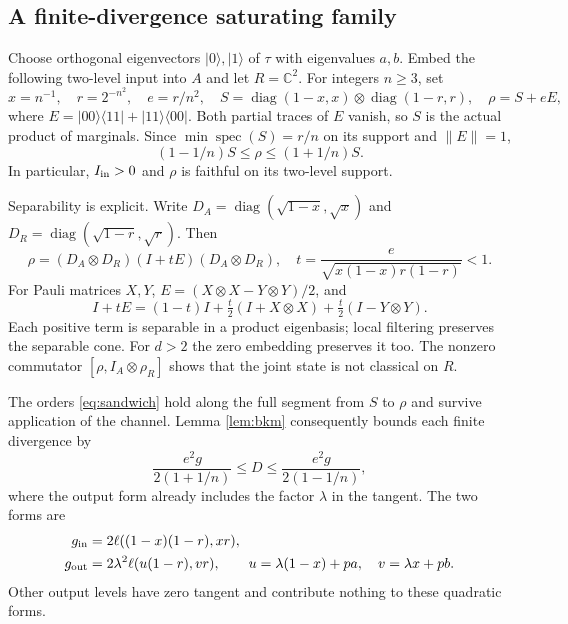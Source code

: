 \documentclass[11pt]{article}
\newcommand{\ket}[1]{|#1\rangle}
\newcommand{\bra}[1]{\langle#1|}
\begin{document}
\subsection{A finite-divergence saturating family}
Choose orthogonal eigenvectors $\ket0,\ket1$ of $\tau$ with eigenvalues $a,b$. Embed the following two-level input into $A$ and let $R=\mathbb C^2$. For integers $n\ge3$, set
\begin{equation}\label{eq:sequence}
 x=n^{-1},\quad r=2^{-n^2},\quad e=r/n^2,\quad
 S=\operatorname{diag}(1-x,x)\otimes\operatorname{diag}(1-r,r),
 \quad\rho=S+eE,
\end{equation}
where $E=\ket{00}\bra{11}+\ket{11}\bra{00}$. Both partial traces of $E$ vanish, so $S$ is the actual product of marginals. Since $\min\operatorname{spec}(S)=r/n$ on its support and $\|E\|=1$,
\begin{equation}\label{eq:sandwich}
 (1-1/n)S\le\rho\le(1+1/n)S.
\end{equation}
In particular, $I_{\rm in}>0$ and $\rho$ is faithful on its two-level support.

Separability is explicit. Write $D_A=\operatorname{diag}(\sqrt{1-x},\sqrt{x})$ and $D_R=\operatorname{diag}(\sqrt{1-r},\sqrt r)$. Then
\[
 \rho=(D_A\otimes D_R)(I+tE)(D_A\otimes D_R),\quad
 t=\frac{e}{\sqrt{x(1-x)r(1-r)}}<1.
\]
For Pauli matrices $X,Y$, $E=(X\otimes X-Y\otimes Y)/2$, and
\[
 I+tE=(1-t)I+\tfrac t2(I+X\otimes X)+\tfrac t2(I-Y\otimes Y).
\]
Each positive term is separable in a product eigenbasis; local filtering preserves the separable cone. For $d>2$ the zero embedding preserves it too. The nonzero commutator $[\rho,I_A\otimes\rho_R]$ shows that the joint state is not classical on $R$.

The orders \eqref{eq:sandwich} hold along the full segment from $S$ to $\rho$ and survive application of the channel. Lemma \ref{lem:bkm} consequently bounds each finite divergence by
\begin{equation}\label{eq:finite}
 \frac{e^2g}{2(1+1/n)}\le D\le\frac{e^2g}{2(1-1/n)},
\end{equation}
where the output form already includes the factor $\lambda$ in the tangent. The two forms are
\begin{align*}
 g_{\rm in}&=2\ell((1-x)(1-r),xr),\\
 g_{\rm out}&=2\lambda^2\ell(u(1-r),vr),\qquad
 u=\lambda(1-x)+pa,\quad v=\lambda x+pb.
\end{align*}
Other output levels have zero tangent and contribute nothing to these quadratic forms.
\end{document}
